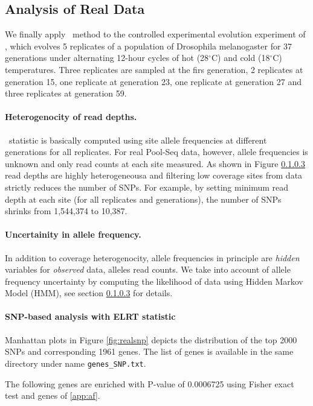 \documentclass[11pt]{article}
\def\comale{\text{{\sc Comale}}}
\begin{document}
\subsection{Analysis of Real Data}
We finally apply \comale\ method to the controlled experimental evolution 
experiment 
of \cite{orozco2012adaptation}, which evolves 5 replicates of a population of 
Drosophila melanogaster for 37 generations under alternating 12-hour cycles of 
hot (28$^{\circ}$C) and cold (18$^{\circ}$C) temperatures. Three replicates are 
sampled at the firs generation, 2 replicates at generation 15, one replicate at 
generation 23, one replicate at generation 27 and three replicates at 
generation 59.
\paragraph{Heterogenocity of read depths.} \comale\ statistic is basically 
computed using site allele frequencies at different generations for all 
replicates. For real Pool-Seq data, however, allele frequencies is unknown and 
only read counts at each site measured. As shown in Figure \ref{} read depths 
are highly heterogeneousa and filtering low coverage sites from data strictly 
reduces the number of SNPs. For example, by setting minimum read depth at 
each site (for all replicates and generations), the number of SNPs shrinks from 
1,544,374 to 10,387. 

\paragraph{Uncertainity in allele frequency.} In addition to coverage 
heterogenocity, 
allele frequencies in principle are 
\emph{hidden} variables for \emph{observed} data, alleles read counts. We 
take into account of allele frequency uncertainty by computing the likelihood 
of data using Hidden Markov Model (HMM), see section \ref{} for details.

\paragraph{SNP-based analysis with ELRT statistic}
Manhattan plots in Figure \ref{fig:realsnp} depicts the distribution of the top 2000 SNPs and corresponding 1961 genes. The list of genes is available in the same directory under name \texttt{genes\_SNP.txt}.

The following genes are enriched with P-value of 0.0006725 using Fisher exact test and genes of \ref{app:af}.
\end{document}
